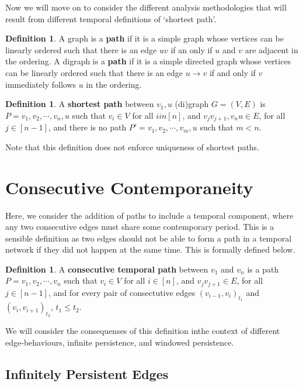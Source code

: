 \documentclass{article}
\theoremstyle{definition}
\newtheorem{defn}[thm]{Definition}
\numberwithin{thm}{subsection}
\begin{document}
Now we will move on to consider the different analysis methodologies that will
result from different temporal definitions of `shortest path'.

\begin{defn}
  A graph is a \textbf{path} if it is a simple graph whose vertices can be linearly
  ordered such that there is an edge $uv$ if an only if $u$ and $v$ are adjacent
  in the ordering.
  A digraph is a \textbf{path} if it is a simple directed graph whose vertices
  can be linearly ordered such that there is an edge $u \to v$ if and only if
  $v$ immediately follows $u$ in the ordering.
\end{defn}

\begin{defn}
 A \textbf{shortest path} between $v_1, u$ (di)graph $G = (V,E)$ is
 $P = v_1, v_2, \cdots, v_n, u$ such that $v_i \in V$ for all $i in [n]$,
 and $v_jv_{j+1}, v_nu \in E$, for all $j \in [n-1]$, and there is no path
 $P' = v_1, v_2, \cdots, v_m, u$ such that $m < n$.
 \end{defn}

Note that this definition does not enforce uniqueness of shortest paths.

\section{Consecutive Contemporaneity}

Here, we consider the addition of paths to include a temporal component, where
any two consecutive edges must share some contemporary period. This is a sensible
definition as two edges should not be able to form a path in a temporal network
if they did not happen at the same time. This is formally defined below.

\begin{defn}
  A \textbf{consecutive temporal path} between $v_1$ and $v_n$ is a path
  $P = v_1, v_2, \cdots, v_n$ such that $v_i \in V$ for all $i \in [n]$,
  and $v_jv_{j+1} \in E$, for all $j \in [n-1]$, and for every pair of
  consectutive edges $(v_{i-1},v_{i})_{t_1}$ and $(v_{i}, v_{i+1})_{t_2}$,
  $t_1 \leq t_2$.
\end{defn}

We will consider the consequenses of this definition inthe context of different
edge-behaviours, infinite persistence, and windowed persistence.

\subsection{Infinitely Persistent Edges}
\end{document}
